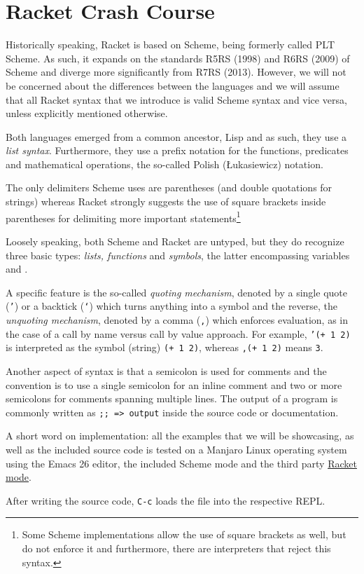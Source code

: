 \chapter{Racket Crash Course}

Historically speaking, Racket is based on Scheme, being formerly called
PLT Scheme. As such, it expands on the standards R5RS (1998) and R6RS (2009)
of Scheme and diverge more significantly from R7RS (2013). However, we will
not be concerned about the differences between the languages and we will
assume that all Racket syntax that we introduce is valid Scheme syntax and
vice versa, unless explicitly mentioned otherwise.

Both languages emerged from a common ancestor, Lisp and as such, they
use a \emph{list syntax}. Furthermore, they use a prefix notation
for the functions, predicates and mathematical operations, the so-called
Polish ({\L}ukasiewicz) notation.

The only delimiters Scheme uses are parentheses (and double quotations
for strings) whereas Racket strongly suggests the use of square brackets
inside parentheses for delimiting more important statements\footnote{Some %
  Scheme implementations allow the use of square brackets as well, but
  do not enforce it and furthermore, there are interpreters that reject
  this syntax.}

Loosely speaking, both Scheme and Racket are untyped, but they do recognize
three basic types: \emph{lists, functions} and \emph{symbols}, the
latter encompassing variables and .

A specific feature is the so-called \emph{quoting mechanism}, denoted
by a single quote (\texttt{'}) or a backtick (\texttt{`}) which
turns anything into a symbol and the reverse, the \emph{unquoting mechanism},
denoted by a comma (\texttt{,}) which enforces evaluation, as in the
case of a call by name versus call by value approach. For example,
\texttt{'(+ 1 2)} is interpreted as the symbol (string) \texttt{(+ 1 2)},
whereas \texttt{,(+ 1 2)} means \texttt{3}.

Another aspect of syntax is that a semicolon is used for comments and
the convention is to use a single semicolon for an inline comment
and two or more semicolons for comments spanning multiple lines.
The output of a program is commonly written as \texttt{;; => output}
inside the source code or documentation.

\begin{remark}\label{rk:implementation}
  A short word on implementation: all the examples that we will be
  showcasing, as well as the included source code is tested on a
  Manjaro Linux operating system using the Emacs 26 editor, the
  included Scheme mode and the third party
  \href{https://www.racket-mode.com/}{Racket mode}.

  After writing the source code, \texttt{C-c} loads the file into
  the respective REPL.
\end{remark}

